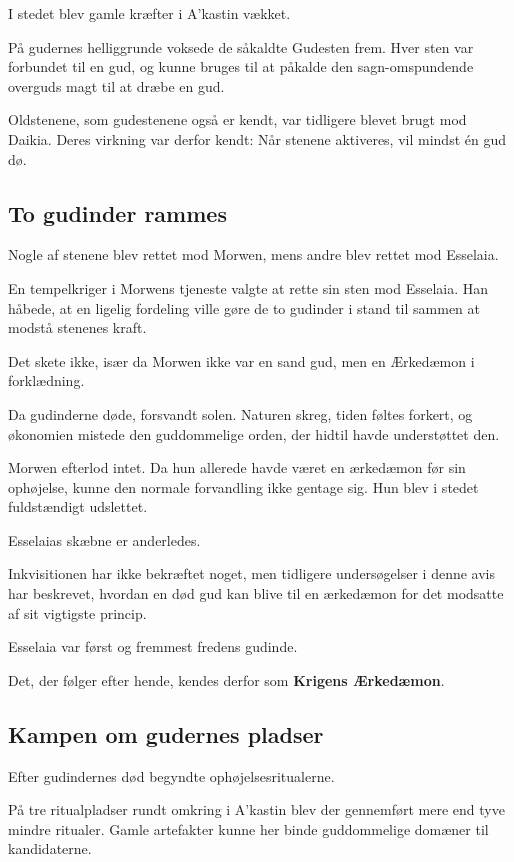 \documentclass[a5paper,10pt,twoside,openany]{memoir}
\begin{document}
I stedet blev gamle kræfter i A'kastin vækket.

På gudernes helliggrunde voksede de såkaldte Gudesten frem. Hver sten var forbundet til en gud, og kunne bruges til at påkalde den sagn-omspundende overguds magt til at dræbe en gud.

Oldstenene, som gudestenene også er kendt, var tidligere blevet brugt mod Daikia. Deres virkning var derfor kendt: Når stenene aktiveres, vil mindst én gud dø.

\subsection*{To gudinder rammes}

Nogle af stenene blev rettet mod Morwen, mens andre blev rettet mod Esselaia.

En tempelkriger i Morwens tjeneste valgte at rette sin sten mod Esselaia. Han håbede, at en ligelig fordeling ville gøre de to gudinder i stand til sammen at modstå stenenes kraft.

Det skete ikke, især da Morwen ikke var en sand gud, men en Ærkedæmon i forklædning.

Da gudinderne døde, forsvandt solen. Naturen skreg, tiden føltes forkert, og økonomien mistede den guddommelige orden, der hidtil havde understøttet den.

Morwen efterlod intet. Da hun allerede havde været en ærkedæmon før sin ophøjelse, kunne den normale forvandling ikke gentage sig. Hun blev i stedet fuldstændigt udslettet.

Esselaias skæbne er anderledes.

Inkvisitionen har ikke bekræftet noget, men tidligere undersøgelser i denne avis har beskrevet, hvordan en død gud kan blive til en ærkedæmon for det modsatte af sit vigtigste princip.

Esselaia var først og fremmest fredens gudinde.

Det, der følger efter hende, kendes derfor som \textbf{Krigens Ærkedæmon}.

\subsection*{Kampen om gudernes pladser}

Efter gudindernes død begyndte ophøjelsesritualerne.

På tre ritualpladser rundt omkring i A'kastin blev der gennemført mere end tyve mindre ritualer. Gamle artefakter kunne her binde guddommelige domæner til kandidaterne.
\end{document}
